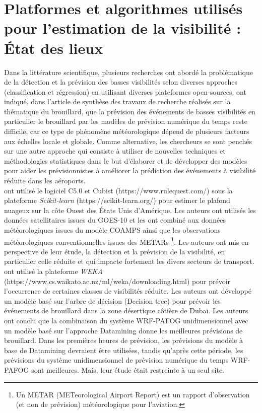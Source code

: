 \section{Platformes et algorithmes utilisés pour l'estimation de la visibilité : État des lieux}
Dans la littérature scientifique, plusieurs recherches ont abordé la problématique de la détection et la prévision des basses visibilités selon diverses approches (classification et régression) en utilisant diverses plateformes open-sources.
\cite{gultepe2007} ont indiqué, dans l’article de synthèse des travaux de recherche réalisés sur la
thématique du brouillard, que la prévision des événements de basses visibilités en particulier le
brouillard par les modèles de prévision numérique du temps reste difficile, car ce type de phénomène
météorologique dépend de plusieurs facteurs aux échelles locale et globale. Comme alternative, les
chercheurs se sont penchés sur une autre approche qui consiste à utiliser de nouvelles techniques et
méthodologies statistiques dans le but d’élaborer et de développer des modèles pour aider les prévisionnistes à améliorer la prédiction des événements à visibilité réduite dans les aéroports.\\

\cite{bankert} ont utilisé le logiciel C5.0 et Cubist (https://www.rulequest.com/) sous la plateforme \textit{Scikit-learn} (https://scikit-learn.org/) pour estimer le plafond nuageux sur la côte Ouest des États Unis d’Amérique. Les auteurs ont utilisés les données satellitaires issues du GOES-10 et les ont combiné aux données météorologiques issues du modèle COAMPS ainsi que les observations météorologiques conventionnelles issues des METARs \footnote{Un METAR (METeorological Airport Report) est un rapport d’observation (et non de prévision)
météorologique pour l’aviation.}. Les auteurs ont mis en perspective de leur étude, la détection et la prévision de la visibilité, en particulier celle réduite et qui impacte fortement les divers secteurs de transport. \\

\cite{bartokova2015fog}  ont utilisé la plateforme
\textit{WEKA} (https://www.cs.waikato.ac.nz/ml/weka/downloading.html) pour prévoir l’occurrence de certaines
classes de visibilités réduite.
Les auteurs ont développé un modèle basé sur l'arbre de décision (Decision tree) pour prévoir les
événements de brouillard dans la zone désertique côtière de Dubaï. Les auteurs ont conclu que la
combinaison du système WRF-PAFOG unidimensionnel avec un modèle basé sur l'approche Datamining
donne les meilleures prévisions de brouillard. Dans les premières heures de prévision, les prévisions du
modèle à base de Datamining devraient être utilisées, tandis qu'après cette période, les prévisions du
système unidimensionnel de prévision numérique du temps WRF-PAFOG sont meilleures. Mais, leur
étude était restreinte à un seul site.\\

